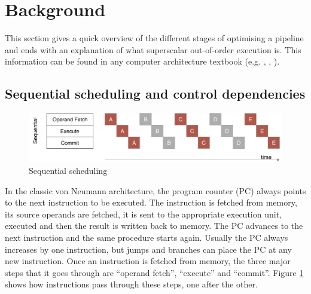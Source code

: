 \documentclass[12pt,a4paper]{article} %
\begin{document}
\newpage
\section{Background}
This section gives a quick overview of the different stages of optimising a pipeline and ends with an explanation of what superscalar out-of-order execution is. This information can be found in any computer architecture textbook (e.g. \cite{lipastiShen}, \cite{Hennessy}, \cite{ProcessorArchitecture}).

\subsection{Sequential scheduling and control dependencies}
\begin{figure}[H]
	\centering
	\includegraphics[width=\textwidth]{Source/SchedulingSchemes/Sequential.pdf}
	\caption{Sequential scheduling} 
	\label{fig-sequential}
\end{figure}
In the classic von Neumann architecture, the program counter (PC) always points to the next instruction to be executed. The instruction is fetched from memory, its source operands are fetched, it is sent to the appropriate execution unit, executed and then the result is written back to memory. The PC advances to the next instruction and the same procedure starts again. Usually the PC always increases by one instruction, but jumps and branches can place the PC at any new instruction. Once an instruction is fetched from memory, the three major steps that it goes through are ``operand fetch'', ``execute'' and ``commit''. Figure \ref{fig-sequential} shows how instructions pass through these steps, one after the other. 
\end{document}

